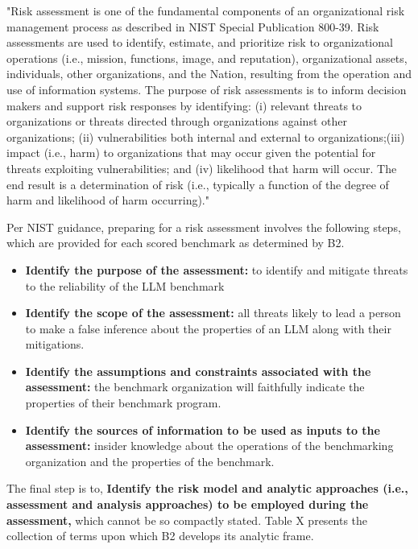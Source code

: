 \documentclass{article}
\begin{document}
\begin{center}
    \begin{tcolorbox}[colback=gray!10, colframe=black!50, width=\textwidth, boxrule=0.5mm, sharp corners, coltext=black]
"Risk assessment is one of the fundamental components of an organizational risk management process as described in NIST Special Publication 800-39. Risk assessments are used to identify, estimate, and prioritize risk to organizational operations (i.e., mission, functions, image, and reputation), organizational assets, individuals, other organizations, and the Nation, resulting from the operation and use of information systems. The purpose of risk assessments is to inform decision makers and support risk responses by identifying: (i) relevant threats to organizations or threats directed through organizations against other organizations; (ii) vulnerabilities both internal and external to organizations;(iii) impact (i.e., harm) to organizations that may occur given the potential for threats exploiting vulnerabilities; and (iv) likelihood that harm will occur. The end result is a determination of risk (i.e., typically a function of the degree of harm and likelihood of harm occurring)."
    \end{tcolorbox}
\end{center}

Per NIST guidance, preparing for a risk assessment involves the following steps, which are provided for each scored benchmark as determined by B2.


\begin{itemize}
    \item {\bf Identify the purpose of the assessment:} to identify and mitigate threats to the reliability of the LLM benchmark
    \item {\bf Identify the scope of the assessment:} all threats likely to lead a person to make a false inference about the properties of an LLM along with their mitigations.
    \item {\bf Identify the assumptions and constraints associated with the assessment:} the benchmark organization will faithfully indicate the properties of their benchmark program.
    \item {\bf Identify the sources of information to be used as inputs to the assessment:} insider knowledge about the operations of the benchmarking organization and the properties of the benchmark.
\end{itemize}

The final step is to, {\bf Identify the risk model and analytic approaches (i.e., assessment and analysis approaches) to be employed during the assessment,} which cannot be so compactly stated. Table X presents the collection of terms upon which B2 develops its analytic frame.
\end{document}
